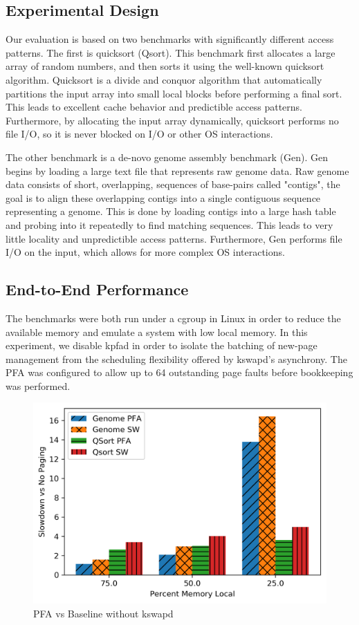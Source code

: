 \subsection{Experimental Design} \label{sec:expDesign}
  Our evaluation is based on two benchmarks with significantly different access
  patterns. The first is quicksort (Qsort). This benchmark first allocates a
  large array of random numbers, and then sorts it using the well-known
  quicksort algorithm.  Quicksort is a divide and conquor algorithm that
  automatically partitions the input array into small local blocks before
  performing a final sort. This leads to excellent cache behavior and
  predictible access patterns.  Furthermore, by allocating the input array
  dynamically, quicksort performs no file I/O, so it is never blocked on I/O or
  other OS interactions.

  The other benchmark is a de-novo genome assembly benchmark (Gen). Gen begins
  by loading a large text file that represents raw genome data. Raw genome data
  consists of short, overlapping, sequences of base-pairs called "contigs", the
  goal is to align these overlapping contigs into a single contiguous sequence
  representing a genome. This is done by loading contigs into a large hash
  table and probing into it repeatedly to find matching sequences. This leads
  to very little locality and unpredictible access patterns. Furthermore, Gen
  performs file I/O on the input, which allows for more complex OS
  interactions.

\subsection{End-to-End Performance} \label{sec:fullPerf}
  The benchmarks were both run under a cgroup in Linux in order to reduce the
  available memory and emulate a system with low local memory. In this
  experiment, we disable kpfad in order to isolate the batching of new-page
  management from the scheduling flexibility offered by kswapd's asynchrony.
  The PFA was configured to allow up to 64 outstanding page faults before
  bookkeeping was performed.

  \begin{figure}[h] \centering
    \includegraphics[width=0.9\columnwidth]{figs/pfa_perf_nokswapd.png}
    \vspace{-5mm}
    \caption{PFA vs Baseline without kswapd}
    \label{fig:pfa_perf}
  \end{figure}

